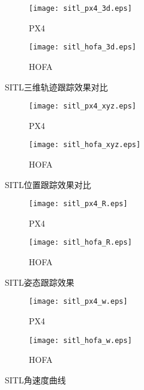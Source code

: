 \begin{figure}[H]
  \centering
  \begin{subfigure}[b]{0.49\linewidth}
      \texttt{[image: sitl\_px4\_3d.eps]}
      \caption{PX4}
  \end{subfigure}
  \hfill %
  \begin{subfigure}[b]{0.49\linewidth}
      \texttt{[image: sitl\_hofa\_3d.eps]}
      \caption{HOFA}
  \end{subfigure}
  \caption{SITL三维轨迹跟踪效果对比}
  \label{SITL三维轨迹跟踪效果对比}
\end{figure}
  \begin{figure}[H]
    \centering
  \begin{subfigure}[b]{0.49\linewidth}
      \texttt{[image: sitl\_px4\_xyz.eps]}
      \caption{PX4}
  \end{subfigure}
  \hfill
  \begin{subfigure}[b]{0.49\linewidth}
      \texttt{[image: sitl\_hofa\_xyz.eps]}
      \caption{HOFA}
  \end{subfigure}
  \caption{SITL位置跟踪效果对比}
  \label{SITL位置跟踪效果对比}
\end{figure}

\begin{figure}[H]
  \centering
\begin{subfigure}[b]{0.49\linewidth}
    \texttt{[image: sitl\_px4\_R.eps]}
    \caption{PX4}
\end{subfigure}
\hfill
\begin{subfigure}[b]{0.49\linewidth}
    \texttt{[image: sitl\_hofa\_R.eps]}
    \caption{HOFA}
\end{subfigure}
\caption{SITL姿态跟踪效果}
\label{SITL姿态跟踪效果}
\end{figure}

\begin{figure}[H]
  \centering
\begin{subfigure}[b]{0.49\linewidth}
    \texttt{[image: sitl\_px4\_w.eps]}
    \caption{PX4}
\end{subfigure}
\hfill
\begin{subfigure}[b]{0.49\linewidth}
    \texttt{[image: sitl\_hofa\_w.eps]}
    \caption{HOFA}
\end{subfigure}
\caption{SITL角速度曲线}
\label{SITL角速度曲线}
\end{figure}


